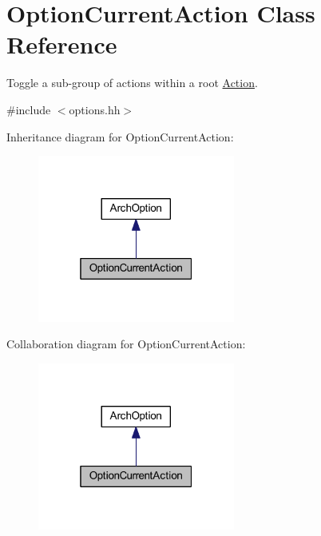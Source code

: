 \hypertarget{class_option_current_action}{}\section{Option\+Current\+Action Class Reference}
\label{class_option_current_action}


Toggle a sub-\/group of actions within a root \mbox{\hyperlink{class_action}{Action}}.  




{\ttfamily \#include $<$options.\+hh$>$}



Inheritance diagram for Option\+Current\+Action\+:
\nopagebreak
\begin{figure}[H]
\begin{center}
\leavevmode
\includegraphics[width=184pt]{class_option_current_action__inherit__graph}
\end{center}
\end{figure}


Collaboration diagram for Option\+Current\+Action\+:
\nopagebreak
\begin{figure}[H]
\begin{center}
\leavevmode
\includegraphics[width=184pt]{class_option_current_action__coll__graph}
\end{center}
\end{figure}
